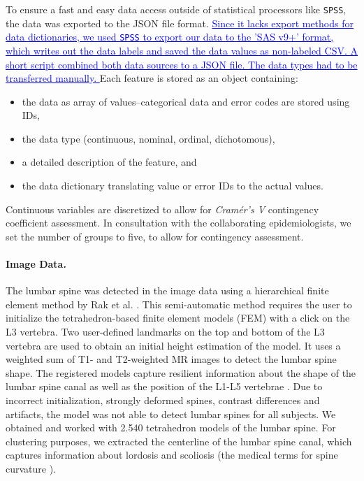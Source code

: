 \documentclass[journal]{style/vgtc} 			          %
\newcommand{\add}[1]{\textcolor{blue}{\uline{#1}}}
\begin{document}
To ensure a fast and easy data access outside of statistical processors like \texttt{SPSS}, the data was exported to the JSON file format.
%
\add{
Since it lacks export methods for data dictionaries, we used \texttt{SPSS} to export our data to the 'SAS v9+' format, which writes out the data labels and saved the data values as non-labeled CSV.
%
A short script combined both data sources to a JSON file.
%
The data types had to be transferred manually.
}
%
Each feature is stored as an object containing: 
\begin{itemize}
	\item the data as array of values--categorical data and error codes are stored using IDs,
	\item the data type (continuous, nominal, ordinal, dichotomous),
	\item a detailed description of the feature, and
	\item the data dictionary translating value or error IDs to the actual values.
\end{itemize}
%
Continuous variables are discretized to allow for \emph{Cram\'{e}r's V} contingency coefficient assessment.
%
In consultation with the collaborating epidemiologists, we set the number of groups to five, to allow for contingency assessment.

\paragraph{Image Data.} \label{Image-Data}
The lumbar spine was detected in the image data using a hierarchical finite element method by Rak et al. \cite{Rak2013}.
%
This semi-automatic method requires the user to initialize the tetrahedron-based finite element models (FEM) with a click on the L3 vertebra.
%
Two user-defined landmarks on the top and bottom of the L3 vertebra are used to obtain an initial height estimation of the model.
%
It uses a weighted sum of T1- and T2-weighted MR images to detect the lumbar spine shape.
%
The registered models capture resilient information about the shape of the lumbar spine canal as well as the position of the L1-L5 vertebrae \cite{Klemm2013VMV}.
%
Due to incorrect initialization, strongly deformed spines, contrast differences and artifacts, the model was not able to detect lumbar spines for all subjects.
%
We obtained and worked with 2.540 tetrahedron models of the lumbar spine.
%
For clustering purposes, we extracted the centerline of the lumbar spine canal, which captures information about lordosis and scoliosis (the medical terms for spine curvature \cite{Klemm2013VMV}).
\end{document}
